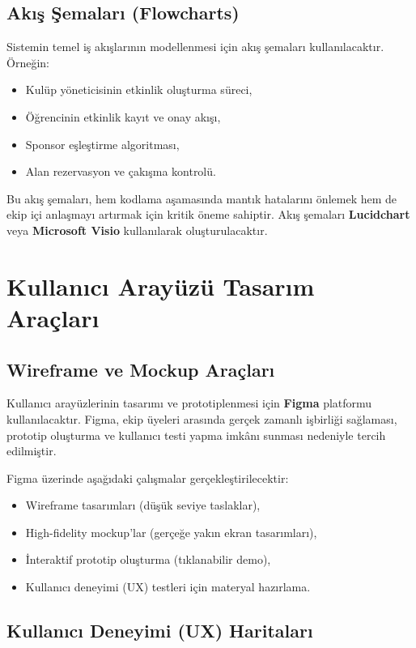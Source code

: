 \documentclass[a4paper,12pt]{report}
\begin{document}
\subsection{Akış Şemaları (Flowcharts)}

Sistemin temel iş akışlarının modellenmesi için akış şemaları kullanılacaktır. Örneğin:

\begin{itemize}
    \item Kulüp yöneticisinin etkinlik oluşturma süreci,
    \item Öğrencinin etkinlik kayıt ve onay akışı,
    \item Sponsor eşleştirme algoritması,
    \item Alan rezervasyon ve çakışma kontrolü.
\end{itemize}

Bu akış şemaları, hem kodlama aşamasında mantık hatalarını önlemek hem de ekip içi anlaşmayı artırmak için kritik öneme sahiptir. Akış şemaları \textbf{Lucidchart} veya \textbf{Microsoft Visio} kullanılarak oluşturulacaktır.

\section{Kullanıcı Arayüzü Tasarım Araçları}

\subsection{Wireframe ve Mockup Araçları}

Kullanıcı arayüzlerinin tasarımı ve prototiplenmesi için \textbf{Figma} platformu kullanılacaktır. Figma, ekip üyeleri arasında gerçek zamanlı işbirliği sağlaması, prototip oluşturma ve kullanıcı testi yapma imkânı sunması nedeniyle tercih edilmiştir.

Figma üzerinde aşağıdaki çalışmalar gerçekleştirilecektir:

\begin{itemize}
    \item Wireframe tasarımları (düşük seviye taslaklar),
    \item High-fidelity mockup'lar (gerçeğe yakın ekran tasarımları),
    \item İnteraktif prototip oluşturma (tıklanabilir demo),
    \item Kullanıcı deneyimi (UX) testleri için materyal hazırlama.
\end{itemize}

\subsection{Kullanıcı Deneyimi (UX) Haritaları}
\end{document}
